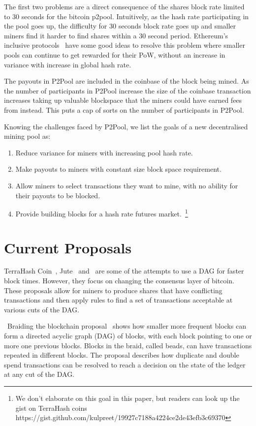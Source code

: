 \documentclass{article}
\begin{document}
The first two problems are a direct consequence of the shares block
rate limited to 30 seconds for the bitcoin p2pool. Intuitively, as the
hash rate participating in the pool goes up, the difficulty for 30
seconds block rate goes up and smaller miners find it harder to find
shares within a 30 second period.  Ethereum's inclusive
protocols~\cite{inclusive-protocols} have some good ideas to resolve
this problem where smaller pools can continue to get rewarded for
their PoW, without an increase in variance with increase in global
hash rate.

The payouts in P2Pool are included in the coinbase of the block being
mined. As the number of participants in P2Pool increase the size of
the coinbase transaction increases taking up valuable blockspace that
the miners could have earned fees from instead. This puts a cap of
sorts on the number of participants in P2Pool.

Knowing the challenges faced by P2Pool, we list the goals of a new
decentralised mining pool as:

\begin{enumerate}
\item Reduce variance for miners with increasing pool hash rate.
\item Make payouts to miners with constant size block space
  requirement.
\item Allow miners to select transactions they want to mine, with no
  ability for their payouts to be blocked.
\item Provide building blocks for a hash rate futures
  market.~\footnote{We don't elaborate on this goal in this paper, but
    readers can look up the gist on TerraHash coins
    https://gist.github.com/kulpreet/19927c7188a4224ce2de43efb3c69370}
\end{enumerate}

\section{Current Proposals}

TerraHash Coin~\cite{mcelrath:variance}, Jute~\cite{jute}
and~\cite{spectre} are some of the attempts to use a DAG for faster
block times. However, they focus on changing the consensus layer of
bitcoin. These proposals allow for miners to produce shares that have
conflicting transactions and then apply rules to find a set of
transactions acceptable at various cuts of the DAG.

\ Braiding the blockchain proposal~\cite{mcelrath:variance} shows how
smaller more frequent blocks can form a directed acyclic graph (DAG)
of blocks, with each block pointing to one or more one previous
blocks. Blocks in the braid, called beads, can have transactions
repeated in different blocks. The proposal describes how duplicate and
double spend transactions can be resolved to reach a decision on the
state of the ledger at any cut of the DAG.\@
\end{document}
